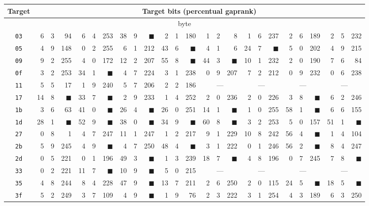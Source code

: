 \begin{tabular}{| c | r@{.} l@{\quad}r | r@{.} l@{\quad}r | r@{.} l@{\quad}r | r@{.} l@{\quad}r | r@{.} l@{\quad}r | r@{.} l@{\quad}r | r@{.} l@{\quad}r | r@{.} l@{\quad}r |}
	\hline
	Target & \multicolumn{24}{c|}{Target bits (percentual gap\quad rank)} \\
	\hline
	\hline
	\multicolumn{25}{|c|}{\nth{1} byte} \\
	\hline
	{\tt 03}&6&3&94&6&4&253&38&9&$\blacksquare$&2&1&180&1&2&8&1&6&237&2&6&189&2&5&232\\
	\hline
	{\tt 05}&4&9&148&0&2&255&6&1&212&43&6&$\blacksquare$&4&1&6&24&7&$\blacksquare$&5&0&202&4&9&215\\
	\hline
	{\tt 09}&9&2&255&4&0&172&12&2&207&55&8&$\blacksquare$&44&3&$\blacksquare$&10&1&232&2&0&190&7&6&84\\
	\hline
	{\tt 0f}&3&2&253&34&1&$\blacksquare$&4&7&224&3&1&238&0&9&207&7&2&212&0&9&232&0&6&238\\
	\hline
	{\tt 11}&5&5&17&1&9&240&5&7&206&2&2&186&\multicolumn{3}{c|}{---}&\multicolumn{3}{c|}{---}&\multicolumn{3}{c|}{---}&\multicolumn{3}{c|}{---}\\
	\hline
	{\tt 17}&14&8&$\blacksquare$&33&7&$\blacksquare$&2&9&233&1&4&252&2&0&236&2&0&226&3&8&$\blacksquare$&6&2&246\\
	\hline
	{\tt 1b}&3&6&63&41&0&$\blacksquare$&26&4&$\blacksquare$&26&0&251&14&1&$\blacksquare$&1&0&255&58&1&$\blacksquare$&6&6&155\\
	\hline
	{\tt 1d}&28&1&$\blacksquare$&52&9&$\blacksquare$&38&0&$\blacksquare$&34&9&$\blacksquare$&60&8&$\blacksquare$&3&2&253&5&0&157&51&1&$\blacksquare$\\
	\hline
	{\tt 27}&0&8&1&4&7&247&11&1&247&1&2&217&9&1&229&10&8&242&56&4&$\blacksquare$&1&4&104\\
	\hline
	{\tt 2b}&5&9&245&4&9&$\blacksquare$&4&7&250&48&4&$\blacksquare$&3&1&222&0&1&246&56&2&$\blacksquare$&8&4&247\\
	\hline
	{\tt 2d}&0&5&221&0&1&196&49&3&$\blacksquare$&1&3&239&18&7&$\blacksquare$&4&8&196&0&7&245&7&8&$\blacksquare$\\
	\hline
	{\tt 33}&0&2&221&11&7&$\blacksquare$&10&9&$\blacksquare$&5&0&215&\multicolumn{3}{c|}{---}&\multicolumn{3}{c|}{---}&\multicolumn{3}{c|}{---}&\multicolumn{3}{c|}{---}\\
	\hline
	{\tt 35}&4&8&244&8&4&228&47&9&$\blacksquare$&13&7&211&2&6&250&2&0&115&24&5&$\blacksquare$&18&5&$\blacksquare$\\
	\hline
	{\tt 3f}&5&2&249&3&7&109&4&9&$\blacksquare$&1&9&76&2&3&222&3&1&254&4&3&189&6&3&250\\

\end{tabular}

